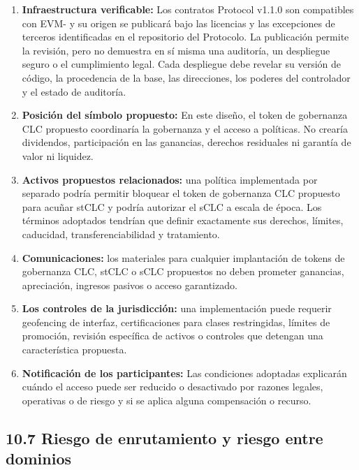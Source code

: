 \documentclass[11pt]{article}
\begin{document}
\begin{enumerate}[leftmargin=*]
\item \textbf{Infraestructura verificable:} Los contratos Protocol v1.1.0 son compatibles con EVM- y su origen se publicará bajo las licencias y las excepciones de terceros identificadas en el repositorio del Protocolo. La publicación permite la revisión, pero no demuestra en sí misma una auditoría, un despliegue seguro o el cumplimiento legal. Cada despliegue debe revelar su versión de código, la procedencia de la base, las direcciones, los poderes del controlador y el estado de auditoría.
\item \textbf{Posición del símbolo propuesto:} En este diseño, el token de gobernanza CLC propuesto coordinaría la gobernanza y el acceso a políticas. No crearía dividendos, participación en las ganancias, derechos residuales ni garantía de valor ni liquidez.
\item \textbf{Activos propuestos relacionados:} una política implementada por separado podría permitir bloquear el token de gobernanza CLC propuesto para acuñar stCLC y podría autorizar el sCLC a escala de época. Los términos adoptados tendrían que definir exactamente sus derechos, límites, caducidad, transferenciabilidad y tratamiento.
\item \textbf{Comunicaciones:} los materiales para cualquier implantación de tokens de gobernanza CLC, stCLC o sCLC propuestos no deben prometer ganancias, apreciación, ingresos pasivos o acceso garantizado.
\item \textbf{Los controles de la jurisdicción:} una implementación puede requerir geofencing de interfaz, certificaciones para clases restringidas, límites de promoción, revisión específica de activos o controles que detengan una característica propuesta.
\item \textbf{Notificación de los participantes:} Las condiciones adoptadas explicarán cuándo el acceso puede ser reducido o desactivado por razones legales, operativas o de riesgo y si se aplica alguna compensación o recurso.
\end{enumerate}
\subsection*{10.7 Riesgo de enrutamiento y riesgo entre dominios}
\end{document}
